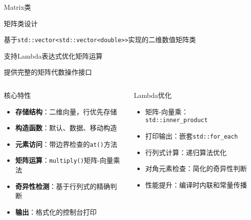 \documentclass[UTF8,aspectratio=169]{beamer}
\begin{document}
\begin{frame}{Matrix类}
    \begin{ytublock}{矩阵类设计}
        \item 基于\texttt{std::vector<std::vector<double>>}实现的二维数值矩阵类
        \item 支持Lambda表达式优化矩阵运算
        \item 提供完整的矩阵代数操作接口
    \end{ytublock}

    \begin{columns}
        \begin{block}{核心特性}
            \begin{itemize}
                \item \textbf{存储结构}：二维向量，行优先存储
                \item \textbf{构造函数}：默认、数据、移动构造
                \item \textbf{元素访问}：带边界检查的\texttt{at()}方法
                \item \textbf{矩阵运算}：\texttt{multiply()}矩阵-向量乘法
                \item \textbf{奇异性检测}：基于行列式的精确判断
                \item \textbf{输出}：格式化的控制台打印
            \end{itemize}
        \end{block}

        \begin{block}{Lambda优化}
            \begin{itemize}
                \item 矩阵-向量乘：\texttt{std::inner\_product}
                \item 打印输出：嵌套\texttt{std::for\_each}
                \item 行列式计算：递归算法优化
                \item 对角元素检查：简化的奇异性判断
                \item 性能提升：编译时内联和常量传播
            \end{itemize}
        \end{block}
    \end{columns}
\end{frame}
\end{document}
